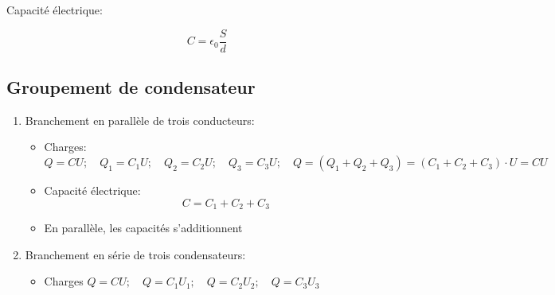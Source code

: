 \documentclass[
    11pt,
    a4paper,
    oneside,
    headinlcude, footinclude,
    twoside,
]{report}
\begin{document}
\begin{description}
        Capacité électrique:

        \begin{equation}
            \label{eq:7.29}
            C = \epsilon_0 \frac{S}{d}
        \end{equation}
\end{description}

\subsection{Groupement de condensateur}
\label{sub:groupement_de_condensateur}


\begin{enumerate}
    \item Branchement en parallèle de trois conducteurs:

        \begin{center}
        \end{center}

        \begin{itemize}
            \item Charges: $Q = CU; \quad Q_1 = C_1 U; \quad Q_2 = C_2 U; \quad Q_3 = C_3 U;
                \quad Q = (Q_1 + Q_2 + Q_3)  = (C_1+C_2+C_3) \cdot U = CU$

            \item Capacité électrique: 
                \begin{equation}
                    \label{eq:7.37}
                    C = C_1 + C_2 + C_3
                \end{equation}
                
            \item En parallèle, les capacités s'additionnent 

        \end{itemize}

    \item Branchement en série de  trois condensateurs:

        \begin{center}
        \end{center}

        \begin{itemize}
            \item Charges $Q = CU; \quad Q = C_1 U_1; \quad Q = C_2 U_2; \quad Q = C_3 U_3$


\end{itemize}
\end{enumerate}
\end{document}
